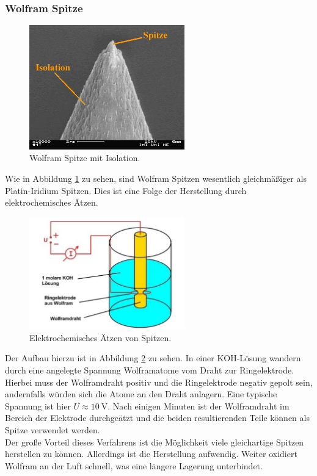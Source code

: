         \subsubsection{Wolfram Spitze}

\begin{figure}[h]
    \centering
    \includegraphics[width=0.6\textwidth]{Abb/wolfram.png}
    \caption{Wolfram Spitze mit Isolation. \cite{wolfram}}
    \label{wolfram}
\end{figure}
Wie in Abbildung \ref{wolfram} zu sehen, sind Wolfram Spitzen wesentlich 
gleichmäßiger als Platin-Iridium Spitzen. Dies ist eine Folge der Herstellung
durch elektrochemisches Ätzen. 
\begin{figure}[h]
    \centering
    \includegraphics[width=0.6\textwidth]{Abb/wolf_verf.png}
    \caption{Elektrochemisches Ätzen von Spitzen. \cite{beschr}}
    \label{wolf-verf}
\end{figure}
Der Aufbau hierzu ist in Abbildung \ref{wolf-verf} zu sehen. In einer KOH-Lösung 
wandern durch eine angelegte Spannung Wolframatome vom Draht zur Ringelektrode.
Hierbei muss der Wolframdraht positiv und die Ringelektrode negativ gepolt sein,
andernfalls würden sich die Atome an den Draht anlagern. Eine typische Spannung 
ist hier $U \approx \SI{10}{\volt}$. Nach einigen Minuten ist der Wolframdraht
im Bereich der Elektrode durchgeätzt und die beiden resultierenden Teile können 
als Spitze verwendet werden.\\
Der große Vorteil dieses Verfahrens ist die Möglichkeit viele gleichartige Spitzen
herstellen zu können. Allerdings ist die Herstellung aufwendig. Weiter oxidiert 
Wolfram an der Luft schnell, was eine längere Lagerung unterbindet.
\cite{beschr}


